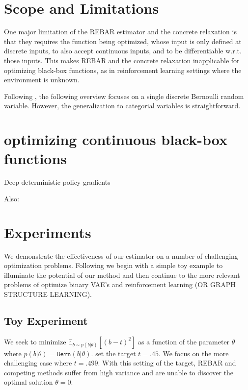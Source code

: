 \documentclass{article}
\begin{document}





\section{Scope and Limitations}
\label{limitations}
One major limitation of the REBAR estimator and the concrete relaxation is that they requires the function being optimized, whose input is only defined at discrete inputs, to also accept continuous inputs, and to be differentiable w.r.t. those inputs.
This makes REBAR and the concrete relaxation inapplicable for optimizing black-box functions, as in reinforcement learning settings where the environment is unknown.

Following \cite{tucker2017rebar}, the following overview focuses on a single discrete Bernoulli random variable.
However, the generalization to categorial variables is straightforward.



\section{optimizing continuous black-box functions}
\label{continuous}
Deep deterministic policy gradients \citep{lillicrap2015continuous}

Also: \citep{levine2016end}


\section{Experiments}
\label{experiments}
We demonstrate the effectiveness of our estimator on a number of challenging optimization problems. Following \cite{tucker2017rebar} we begin with a simple toy example to illuminate the potential of our method and then continue to the more relevant problems of optimize binary VAE's and reinforcement learning (OR GRAPH STRUCTURE LEARNING).


\subsection{Toy Experiment}
We seek to minimize $\mathbb{E}_{b \sim p(b|\theta)}[(b - t)^2]$ as a function of the parameter $\theta$ where $p(b|\theta) = \mathtt{Bern}(b|\theta)$. \cite{tucker2017rebar} set the target $t = .45$.
We focus on the more challenging case where $t = .499$.
With this setting of the target, REBAR and competing methods suffer from high variance and are unable to discover the optimal solution $\theta = 0$.
\end{document}
